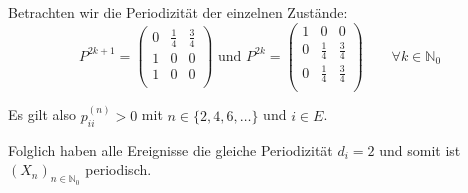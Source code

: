 \documentclass[a4paper]{scrartcl}
\newcommand{\N}{\mathbb{N}}
\def \blattnr {3}
\begin{document}
\begin{enumerate}[label=\bfseries \blattnr.\arabic*]
\begin{enumerate}
      Betrachten wir die Periodizität der einzelnen Zustände:
      \begin{equation*}
          P^{2k+1} =
          \begin{pmatrix}
              0 & \frac{1}{4} & \frac{3}{4} \\
              1 & 0 & 0 \\
              1 & 0 & 0 \\
          \end{pmatrix}
          \text{ und }
          P^{2k} =
          \begin{pmatrix}
              1 & 0 & 0 \\
              0 & \frac{1}{4} & \frac{3}{4} \\
              0 & \frac{1}{4} & \frac{3}{4} \\
          \end{pmatrix}
          \qquad
          \forall k \in \N_0
      \end{equation*}
      
      Es gilt also $p^{(n)}_{ii} > 0$ mit $n \in \{ 2,4,6,\ldots \}$ und $i \in E$.
      
      Folglich haben alle Ereignisse die gleiche Periodizität $d_i=2$ und somit ist $(X_n)_{n\in\N_0}$ periodisch.
     \end{enumerate}


\end{enumerate}
\end{document}
